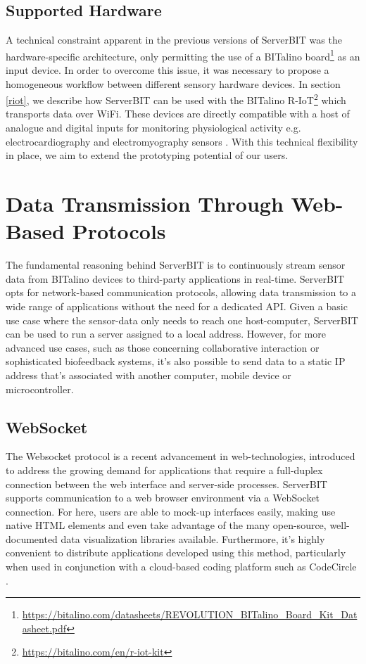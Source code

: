 \subsection{Supported Hardware} \label{hardware}

A technical constraint apparent in the previous versions of ServerBIT was the hardware-specific architecture, only permitting the use of a BITalino board\footnote{\url{https://bitalino.com/datasheets/REVOLUTION_BITalino_Board_Kit_Datasheet.pdf}} as an input device. In order to overcome this issue, it was necessary to propose a homogeneous workflow between different sensory hardware devices. In section \ref{riot}, we describe how ServerBIT can be used with the BITalino R-IoT\footnote{\url{https://bitalino.com/en/r-iot-kit}} which transports data over WiFi. These devices are directly compatible with a host of analogue and digital inputs for monitoring physiological activity e.g. electrocardiography and electromyography sensors . With this technical flexibility in place, we aim to extend the prototyping potential of our users.
\newpage

\section{Data Transmission Through Web-Based Protocols}
The fundamental reasoning behind ServerBIT is to continuously stream sensor data from BITalino devices to third-party applications in real-time. ServerBIT opts for network-based communication protocols, allowing data transmission to a wide range of applications without the need for a dedicated API. Given a basic use case where the sensor-data only needs to reach one host-computer, ServerBIT can be used to run a server assigned to a local address. However, for more advanced use cases, such as those concerning collaborative interaction or sophisticated biofeedback systems, it’s also possible to send data to a static IP address that's associated with another computer, mobile device or microcontroller.

\subsection{WebSocket}

The Websocket protocol is a recent advancement in web-technologies\cite{lombardi_websocket:_2015}, introduced to address the growing demand for applications that require a full-duplex connection between the web interface and server-side processes. ServerBIT supports communication to a web browser environment via a WebSocket connection. For here, users are able to mock-up interfaces easily, making use native HTML elements and even take advantage of the many open-source, well-documented data visualization libraries available. Furthermore, it’s highly convenient to distribute applications developed using this method, particularly when used in conjunction with a cloud-based coding platform such as CodeCircle \cite{fiala2016collaborative}.

